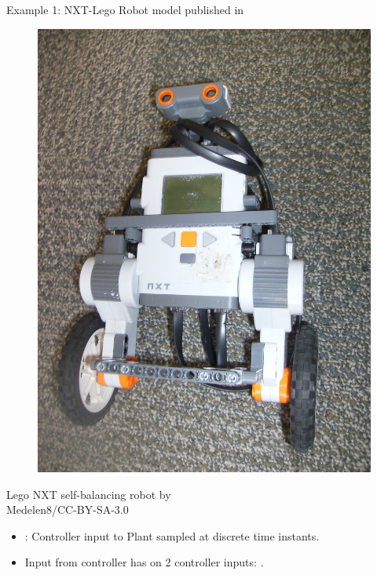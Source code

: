 \begin{frame}{Example 1: NXT-Lego Robot model}
 published in  

\begin{minipage}{0.3\textwidth}
\begin{figure}
\centering
\includegraphics[scale=0.09]{fig/NXT-lego.JPG}
\end{figure}
\end{minipage}
\begin{minipage}{0.6\textwidth}
{\footnotesize Lego NXT self-balancing robot by\\ Medelen8/CC-BY-SA-3.0}
\begin{itemize}
\item {}: Controller input to Plant sampled at discrete time instants.
\item Input from controller has  on {\color{violet} 2 controller inputs}: .
\end{itemize}
\end{minipage}


\end{frame}
